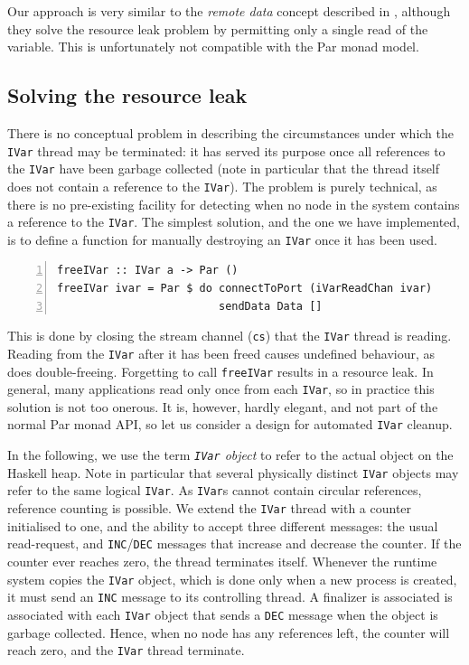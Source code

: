 \documentclass[a4paper, oneside, final]{memoir}
\begin{document}
Our approach is very similar to the \textit{remote data} concept
described in \cite{remotedata}, although they solve the resource leak
problem by permitting only a single read of the variable.  This is
unfortunately not compatible with the Par monad model.

\subsection{Solving the resource leak}

There is no conceptual problem in describing the circumstances under
which the \texttt{IVar} thread may be terminated: it has served its
purpose once all references to the \texttt{IVar} have been garbage
collected (note in particular that the thread itself does not contain
a reference to the \texttt{IVar}).  The problem is purely technical,
as there is no pre-existing facility for detecting when no node in the
system contains a reference to the \texttt{IVar}.  The simplest
solution, and the one we have implemented, is to define a function for
manually destroying an \texttt{IVar} once it has been used.

\begin{lstlisting}[numbers=left, numberstyle=\tiny]
freeIVar :: IVar a -> Par ()
freeIVar ivar = Par $ do connectToPort (iVarReadChan ivar)
                         sendData Data []
\end{lstlisting}

This is done by closing the stream channel (\texttt{cs}) that the
\texttt{IVar} thread is reading.  Reading from the \texttt{IVar} after
it has been freed causes undefined behaviour, as does double-freeing.
Forgetting to call \texttt{freeIVar} results in a resource leak.  In
general, many applications read only once from each \texttt{IVar}, so
in practice this solution is not too onerous.  It is, however, hardly
elegant, and not part of the normal Par monad API, so let us consider
a design for automated \texttt{IVar} cleanup.

In the following, we use the term \textit{\texttt{IVar} object} to
refer to the actual object on the Haskell heap.  Note in particular
that several physically distinct \texttt{IVar} objects may refer to
the same logical \texttt{IVar}.  As \texttt{IVar}s cannot contain
circular references, reference counting is possible.  We extend the
\texttt{IVar} thread with a counter initialised to one, and the
ability to accept three different messages: the usual read-request,
and \texttt{INC}/\texttt{DEC} messages that increase and decrease the
counter.  If the counter ever reaches zero, the thread terminates
itself.  Whenever the runtime system copies the \texttt{IVar} object,
which is done only when a new process is created, it must send an
\texttt{INC} message to its controlling thread.  A finalizer is
associated is associated with each \texttt{IVar} object that sends a
\texttt{DEC} message when the object is garbage collected.  Hence,
when no node has any references left, the counter will reach zero, and
the \texttt{IVar} thread terminate.
\end{document}
